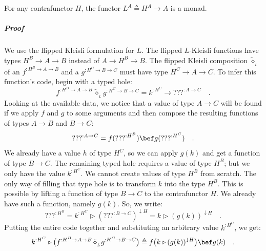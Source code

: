 For any contrafunctor $H$, the functor $L^{A}\triangleq H^{A}\rightarrow A$
is a monad.

\subparagraph{Proof}

We use the flipped Kleisli formulation for $L$. The flipped $L$-Kleisli
functions have types $H^{B}\rightarrow A\rightarrow B$ instead of
$A\rightarrow H^{B}\rightarrow B$. The flipped Kleisli composition
$\tilde{\diamond}_{_{L}}$ of an $f^{:H^{B}\rightarrow A\rightarrow B}$
and a $g^{:H^{C}\rightarrow B\rightarrow C}$ must have type $H^{C}\rightarrow A\rightarrow C$.
To infer this function\textsf{'}s code, begin with a typed hole:
\[
f^{:H^{B}\rightarrow A\rightarrow B}\,\tilde{\diamond}_{_{L}}g^{:H^{C}\rightarrow B\rightarrow C}=k^{:H^{C}}\rightarrow\text{???}^{:A\rightarrow C}\quad.
\]
Looking at the available data, we notice that a value of type $A\rightarrow C$
will be found if we apply $f$ and $g$ to some arguments and then
compose the resulting functions of types $A\rightarrow B$ and $B\rightarrow C$:
\[
\text{???}^{:A\rightarrow C}=f(\text{???}^{:H^{B}})\bef g(\text{???}^{:H^{C}})\quad.
\]
We already have a value $h$ of type $H^{C}$, so we can apply $g(k)$
and get a function of type $B\rightarrow C$. The remaining typed
hole requires a value of type $H^{B}$; but we only have the value
$k^{:H^{C}}$. We cannot create values of type $H^{B}$ from scratch.
The only way of filling that type hole is to transform $k$ into the
type $H^{B}$. This is possible by lifting a function of type $B\rightarrow C$
to the contrafunctor $H$. We already have such a function, namely
$g(k)$. So, we write:
\[
\text{???}^{:H^{B}}=k^{:H^{C}}\triangleright(\text{???}^{:B\rightarrow C})^{\downarrow H}=k\triangleright(g(k))^{\downarrow H}\quad.
\]
Putting the entire code together and substituting an arbitrary value
$k^{:H^{C}}$, we get:
\begin{equation}
k^{:H^{C}}\triangleright\big(f^{:H^{B}\rightarrow A\rightarrow B}\,\tilde{\diamond}_{_{L}}g^{:H^{C}\rightarrow B\rightarrow C}\big)\triangleq f\big(k\triangleright(g(k))^{\downarrow H}\big)\bef g(k)\quad.\label{eq:def-of-Kleisli-for-exp-construction-h-a-a}
\end{equation}

